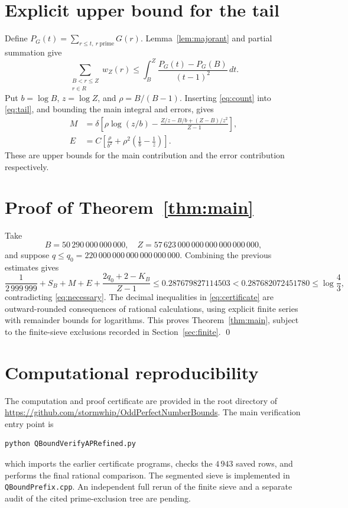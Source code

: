 \documentclass[11pt]{article}
\begin{document}
\section{Explicit upper bound for the tail}

Define \(P_G(t)=\sum_{r\le t,\ r\ \mathrm{prime}}G(r)\). Lemma~\ref{lem:majorant} and partial summation give
\begin{equation}\label{eq:tail}
\sum_{\substack{B<r\le Z\\r\in R}}w_Z(r)
\le \int_B^Z\frac{P_G(t)-P_G(B)}{(t-1)^2}\,dt.
\end{equation}
Put \(b=\log B\), \(z=\log Z\), and \(\rho=B/(B-1)\). Inserting \eqref{eq:count} into \eqref{eq:tail}, and bounding the main integral and errors, gives
\begin{align}
M&=\delta\left[\rho\log(z/b)
-\frac{Z/z-B/b+(Z-B)/z^2}{Z-1}\right],\label{eq:M}\\
E&=C\left[\frac{\rho}{b^2}
+\rho^2\left(\frac1b-\frac1z\right)\right].\label{eq:E}
\end{align}
These are upper bounds for the main contribution and the error contribution respectively.

\section{Proof of Theorem~\ref{thm:main}}

Take
\[
B=50\,290\,000\,000\,000,\quad
Z=57\,623\,000\,000\,000\,000\,000\,000,
\]
and suppose \(q\le q_0=220\,000\,000\,000\,000\,000\,000\). Combining the previous estimates gives
\begin{equation}\label{eq:certificate}
\frac1{2\,999\,999}+S_B+M+E+
\frac{2q_0+2-K_B}{Z-1}\le 0.287679827114503
<0.287682072451780\le\log\frac43,
\end{equation}
contradicting \eqref{eq:necessary}. The decimal inequalities in \eqref{eq:certificate} are outward-rounded consequences of rational calculations, using explicit finite series with remainder bounds for logarithms. This proves Theorem~\ref{thm:main}, subject to the finite-sieve exclusions recorded in Section~\ref{sec:finite}. \qed

\section{Computational reproducibility}

The computation and proof certificate are provided in the root directory of \url{https://github.com/stormwhip/OddPerfectNumberBounds}. The main verification entry point is
\begin{verbatim}
python QBoundVerifyAPRefined.py
\end{verbatim}
which imports the earlier certificate programs, checks the \(4\,943\) saved rows, and performs the final rational comparison. The segmented sieve is implemented in \texttt{QBoundPrefix.cpp}. An independent full rerun of the finite sieve and a separate audit of the cited prime-exclusion tree are pending.
\end{document}
